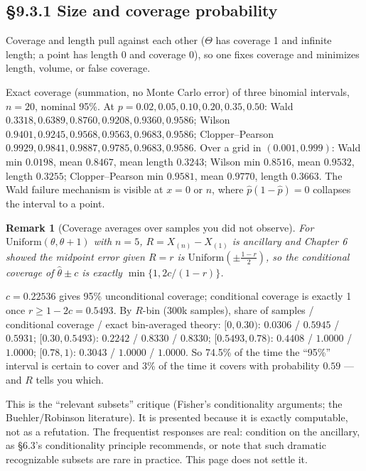 \documentclass[11pt]{article}
\newtheorem{remark}[theorem]{Remark}
\begin{document}
\subsection{\S9.3.1 Size and coverage probability}
Coverage and length pull against each other ($\Theta$ has coverage 1 and infinite length; a point has length 0 and coverage 0), so one fixes coverage and minimizes length, volume, or false coverage.
\begin{simbox}
Exact coverage (summation, no Monte Carlo error) of three binomial intervals, $n=20$, nominal 95\%. At $p=0.02,0.05,0.10,0.20,0.35,0.50$: Wald $0.3318,0.6389,0.8760,0.9208,0.9360,0.9586$; Wilson $0.9401,0.9245,0.9568,0.9563,0.9683,0.9586$; Clopper--Pearson $0.9929,0.9841,0.9887,0.9785,0.9683,0.9586$. Over a grid in $(0.001,0.999)$: Wald min $0.0198$, mean $0.8467$, mean length $0.3243$; Wilson min $0.8516$, mean $0.9532$, length $0.3255$; Clopper--Pearson min $0.9581$, mean $0.9770$, length $0.3663$. The Wald failure mechanism is visible at $x=0$ or $n$, where $\hat p(1-\hat p)=0$ collapses the interval to a point.
\end{simbox}
\begin{remark}[Coverage averages over samples you did not observe]
For $\mathrm{Uniform}(\theta,\theta+1)$ with $n=5$, $R=X_{(n)}-X_{(1)}$ is ancillary and Chapter 6 showed the midpoint error given $R=r$ is $\mathrm{Uniform}(\pm\frac{1-r}2)$, so the conditional coverage of $\hat\theta\pm c$ is exactly $\min\{1,2c/(1-r)\}$.
\end{remark}
\begin{simbox}
$c=0.22536$ gives 95\% unconditional coverage; conditional coverage is exactly 1 once $r\ge1-2c=0.5493$. By $R$-bin (300k samples), share of samples / conditional coverage / exact bin-averaged theory: $[0,0.30)$: $0.0306$ / $0.5945$ / $0.5931$; $[0.30,0.5493)$: $0.2242$ / $0.8330$ / $0.8330$; $[0.5493,0.78)$: $0.4408$ / $1.0000$ / $1.0000$; $[0.78,1)$: $0.3043$ / $1.0000$ / $1.0000$. So 74.5\% of the time the ``95\%'' interval is certain to cover and 3\% of the time it covers with probability $0.59$ --- and $R$ tells you which.
\end{simbox}
\begin{flagbox}
This is the ``relevant subsets'' critique (Fisher's conditionality arguments; the Buehler/Robinson literature). It is presented because it is exactly computable, not as a refutation. The frequentist responses are real: condition on the ancillary, as \S6.3's conditionality principle recommends, or note that such dramatic recognizable subsets are rare in practice. This page does not settle it.
\end{flagbox}
\end{document}
